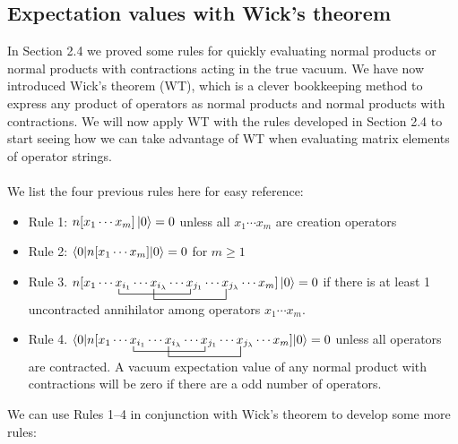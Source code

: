 \documentclass{article}
\newcommand{\ctr}{\bcontraction}
\newcommand{\cd}{\ensuremath{\cdots} }
\begin{document}
\subsection{Expectation values with Wick's theorem }
In Section 2.4 we proved some rules for quickly evaluating normal products or normal products with contractions acting in the true vacuum. 
We have now introduced Wick's theorem (WT), which is a clever bookkeeping method to express any product of operators as normal products and normal products with contractions. 
We will now apply WT with the rules developed in Section 2.4 to start seeing how we can take advantage of WT when evaluating matrix elements of operator strings. 
\\ \\
We list the four previous rules here for easy reference: 
\begin{itemize}
\item Rule 1: $n[x_1 \cd x_m]\ket{0} = 0$ unless all $x_1 \cd x_m$ are creation operators \\
\item Rule 2: $\braket{0 | n[x_1 \cd x_m] | 0} = 0$ for  $m \geq 1$ \\
\item Rule 3. $\ctr{n[x_1 \cd }{x}{{}_{i_1} \cd x_{i_\lambda} \cd }{x}
\ctr[2ex]{n[x_1 \cd x_{i_1} \cd}{ x}{{}_{i_\lambda} \cd x_{j_1} \cd }{x} 
n[x_1 \cd x_{i_1} \cd x_{i_\lambda} \cd x_{j_1} \cd x_{j_\lambda} \cd x_m] \ket{0} = 0$ if there is at least 1 uncontracted annihilator among operators $x_1 \cd x_m$.  \\
\item Rule 4. $\braket{0| \ctr{n[x_1 \cd }{x}{{}_{i_1} \cd x_{i_\lambda} \cd }{x}
\ctr[2ex]{n[x_1 \cd x_{i_1} \cd}{ x}{{}_{i_\lambda} \cd x_{j_1} \cd }{x} 
n[x_1 \cd x_{i_1} \cd x_{i_\lambda} \cd x_{j_1} \cd x_{j_\lambda} \cd x_m] |0} = 0$ unless all operators are contracted.
A vacuum expectation value of any normal product with contractions will be zero if there are a odd number of operators. \\
\end{itemize}

We can use Rules 1--4 in conjunction with Wick's theorem to develop some more rules: 
\end{document}
